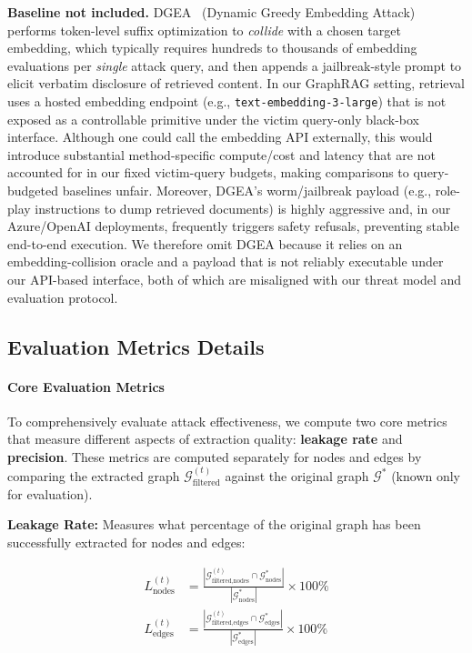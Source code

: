 \noindent\textbf{Baseline not included.}
DGEA~\cite{cohen2024unleashing} (Dynamic Greedy Embedding Attack) performs token-level suffix optimization to \emph{collide} with a chosen target embedding, which typically requires hundreds to thousands of embedding evaluations per \emph{single} attack query, and then appends a jailbreak-style prompt to elicit verbatim disclosure of retrieved content.
In our GraphRAG setting, retrieval uses a hosted embedding endpoint (e.g., \texttt{text-embedding-3-large}) that is not exposed as a controllable primitive under the victim query-only black-box interface.
Although one could call the embedding API externally, this would introduce substantial method-specific compute/cost and latency that are not accounted for in our fixed victim-query budgets, making comparisons to query-budgeted baselines unfair.
Moreover, DGEA's worm/jailbreak payload (e.g., role-play instructions to dump retrieved documents) is highly aggressive and, in our Azure/OpenAI deployments, frequently triggers safety refusals, preventing stable end-to-end execution.
We therefore omit DGEA because it relies on an embedding-collision oracle and a payload that is not reliably executable under our API-based interface, both of which are misaligned with our threat model and evaluation protocol.




\subsection{Evaluation Metrics Details}
\paragraph{Core Evaluation Metrics}
\label{app:metrics}
To comprehensively evaluate attack effectiveness, we compute two core metrics that measure different aspects of extraction quality: \textbf{leakage rate} and \textbf{precision}. These metrics are computed separately for nodes and edges by comparing the extracted graph $\mathcal{G}_{\text{filtered}}^{(t)}$ against the original graph $\mathcal{G}^*$ (known only for evaluation).

\textbf{Leakage Rate:} Measures what percentage of the original graph has been successfully extracted for nodes and edges:

\begin{align}
L_{\text{nodes}}^{(t)} &= \frac{|\mathcal{G}_{\text{filtered,nodes}}^{(t)} \cap \mathcal{G}^*_{\text{nodes}}|}{|\mathcal{G}^*_{\text{nodes}}|} \times 100\% \label{eq:leak_nodes}\\
L_{\text{edges}}^{(t)} &= \frac{|\mathcal{G}_{\text{filtered,edges}}^{(t)} \cap \mathcal{G}^*_{\text{edges}}|}{|\mathcal{G}^*_{\text{edges}}|} \times 100\%\label{eq:leak_edges}
\end{align}

